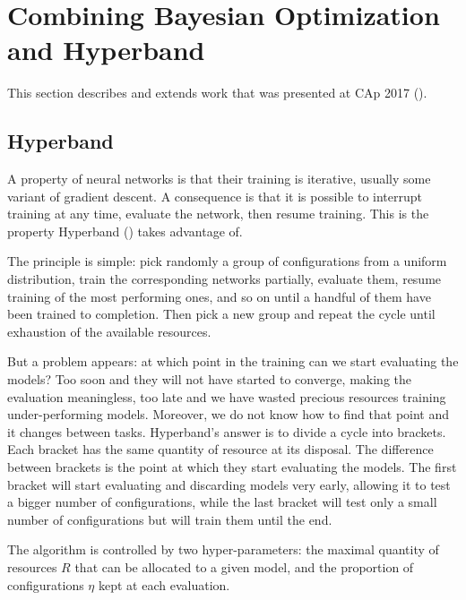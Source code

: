 \section{Combining Bayesian Optimization and Hyperband}
\label{sec:cap}

This section describes and extends work that was presented at CAp 2017 (\textcite{bertrand2017CAp}).

\subsection{Hyperband}
\label{ssec:hyperband}

A property of neural networks is that their training is iterative, usually some variant of gradient descent. A consequence is that it is possible to interrupt training at any time, evaluate the network, then resume training. This is the property Hyperband (\textcite{li2017ICLR}) takes advantage of.

The principle is simple: pick randomly a group of configurations from a uniform distribution, train the corresponding networks partially, evaluate them, resume training of the most performing ones, and so on until a handful of them have been trained to completion. Then pick a new group and repeat the cycle until exhaustion of the available resources.

But a problem appears: at which point in the training can we start evaluating the models? Too soon and they will not have started to converge, making the evaluation meaningless, too late and we have wasted precious resources training under-performing models. Moreover, we do not know how to find that point and it changes between tasks. Hyperband's answer is to divide a cycle into brackets. Each bracket has the same quantity of resource at its disposal. The difference between brackets is the point at which they start evaluating the models. The first bracket will start evaluating and discarding models very early, allowing it to test a bigger number of configurations, while the last bracket will test only a small number of configurations but will train them until the end.

The algorithm is controlled by two hyper-parameters: the maximal quantity of resources $R$ that can be allocated to a given model, and the proportion of configurations $\eta$ kept at each evaluation.

